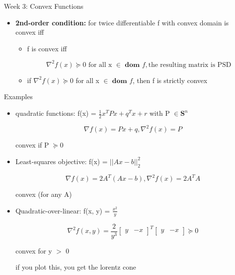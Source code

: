 \documentclass{article}
\begin{document}
\begin{homeworkProblemName}{{\LARGE Week 3: Convex Functions}}
\begin{problemAnswer}
{\begin{itemize}
      \item \textbf{2nd-order condition: } for twice differentiable f with convex domain
        is convex iff

        \begin{itemize}
        \item f is convex iff

          $$ \nabla^2 f(x) \succeq 0 \text{ for all x } \in \textbf{ dom } f, \text{the
            resulting matrix is PSD} $$

        \item if $ \nabla^2 f(x) \succeq 0$ for all x $\in \textbf{ dom } f $, then f is
          strictly convex
        \end{itemize}

      \end{itemize}

    }\end{problemAnswer}


  \begin{problemAnswer}{
    Examples

    \begin{itemize}
    \item quadratic functions: f(x) = $\frac{1}{2}x^TPx + q^Tx + r$ with P $\in
      \bm{S}^n$

      $$ \nabla f(x) = Px + q, \nabla^2 f(x) = P $$

      convex if P $\succeq$0

    \item Least-squares objective: f(x) = $|| Ax - b||_2^2$

      $$ \nabla f(x) = 2A^T(Ax - b), \nabla^2f(x) = 2A^TA $$

      convex (for any A)

    \item Quadratic-over-linear: f(x, y) = $\frac{x^2}{y}$

      $$ \nabla^2 f(x, y) = \frac{2}{y^3} \begin{bmatrix}y & -x\end{bmatrix}^T \begin{bmatrix}y & -x\end{bmatrix} \succeq 0$$

      convex for y $>$ 0

      if you plot this, you get the lorentz cone
    \end{itemize}


    }\end{problemAnswer}


\end{homeworkProblemName}
\end{document}
